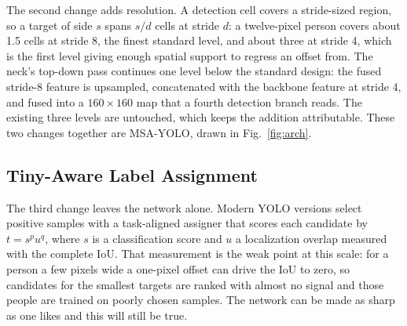 \documentclass[conference,a4paper]{IEEEtran}
\begin{document}
The second change adds resolution. A detection cell covers a stride-sized
region, so a target of side $s$ spans $s/d$ cells at stride $d$: a twelve-pixel
person covers about 1.5 cells at stride 8, the finest standard level, and about
three at stride 4, which is the first level giving enough spatial support to
regress an offset from. The neck's top-down pass continues one level below the
standard design: the fused stride-8 feature is upsampled, concatenated with the
backbone feature at stride 4, and fused into a $160 \times 160$ map that a
fourth detection branch reads. The existing three levels are untouched, which
keeps the addition attributable. These two changes together are MSA-YOLO,
drawn in Fig.~\ref{fig:arch}.

\subsection{Tiny-Aware Label Assignment}
\label{sec:assign}
The third change leaves the network alone. Modern YOLO versions select positive
samples with a task-aligned assigner that scores each candidate by
$t = s^{p} u^{q}$, where $s$ is a classification score and $u$ a localization
overlap measured with the complete IoU. That measurement is the weak point at
this scale: for a person a few pixels wide a one-pixel offset can drive the IoU
to zero, so candidates for the smallest targets are ranked with almost no signal
and those people are trained on poorly chosen samples. The network can be made
as sharp as one likes and this will still be true.
\end{document}
